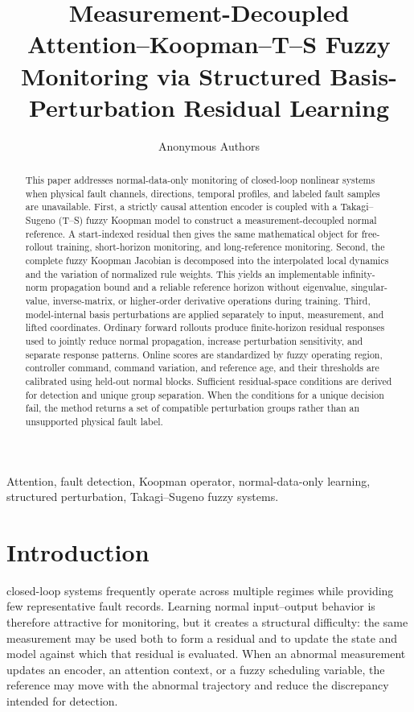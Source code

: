 \documentclass[journal]{IEEEtran}
\title{Measurement-Decoupled Attention--Koopman--T--S Fuzzy Monitoring via Structured Basis-Perturbation Residual Learning}
\author{Anonymous Authors}
\newcommand{\1}{\bm 1}
\begin{document}
\maketitle

\begin{abstract}
This paper addresses normal-data-only monitoring of closed-loop nonlinear
systems when physical fault channels, directions, temporal profiles, and
labeled fault samples are unavailable. First, a strictly causal attention
encoder is coupled with a Takagi--Sugeno (T--S) fuzzy Koopman model to construct
a measurement-decoupled normal reference. A start-indexed residual then gives
the same mathematical object for free-rollout training, short-horizon
monitoring, and long-reference monitoring. Second, the complete fuzzy Koopman
Jacobian is decomposed into the interpolated local dynamics and the variation
of normalized rule weights. This yields an implementable infinity-norm
propagation bound and a reliable reference horizon without eigenvalue,
singular-value, inverse-matrix, or higher-order derivative operations during
training. Third, model-internal basis perturbations are applied separately to
input, measurement, and lifted coordinates. Ordinary forward rollouts produce
finite-horizon residual responses used to jointly reduce normal propagation,
increase perturbation sensitivity, and separate response patterns. Online
scores are standardized by fuzzy operating region, controller command,
command variation, and reference age, and their thresholds are calibrated
using held-out normal blocks. Sufficient residual-space conditions are derived
for detection and unique group separation. When the conditions for a unique
decision fail, the method returns a set of compatible perturbation groups
rather than an unsupported physical fault label.
\end{abstract}

\begin{IEEEkeywords}
Attention, fault detection, Koopman operator, normal-data-only learning,
structured perturbation, Takagi--Sugeno fuzzy systems.
\end{IEEEkeywords}

\section{Introduction}
 closed-loop systems frequently operate across
multiple regimes while providing few representative fault records. Learning
normal input--output behavior is therefore attractive for monitoring, but it
creates a structural difficulty: the same measurement may be used both to
form a residual and to update the state and model against which that residual
is evaluated. When an abnormal measurement updates an encoder, an attention
context, or a fuzzy scheduling variable, the reference may move with the
abnormal trajectory and reduce the discrepancy intended for detection.
\end{document}
